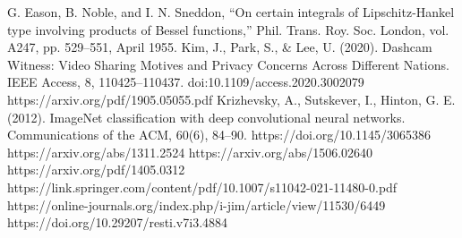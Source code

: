 \documentclass[conference]{IEEEtran}
\begin{document}

\begin{thebibliography}{00}
 G. Eason, B. Noble, and I. N. Sneddon, ``On certain integrals of Lipschitz-Hankel type involving products of Bessel functions,'' Phil. Trans. Roy. Soc. London, vol. A247, pp. 529--551, April 1955.
 Kim, J., Park, S., \& Lee, U. (2020). Dashcam Witness: Video Sharing Motives and Privacy Concerns Across Different Nations. IEEE Access, 8, 110425–110437. doi:10.1109/access.2020.3002079 
 https://arxiv.org/pdf/1905.05055.pdf
 Krizhevsky, A., Sutskever, I., Hinton, G. E. (2012). ImageNet classification with deep convolutional neural networks. Communications of the ACM, 60(6), 84–90. https://doi.org/10.1145/3065386
 https://arxiv.org/abs/1311.2524
 https://arxiv.org/abs/1506.02640
 https://arxiv.org/pdf/1405.0312
 https://link.springer.com/content/pdf/10.1007/s11042-021-11480-0.pdf
 https://online-journals.org/index.php/i-jim/article/view/11530/6449
 https://doi.org/10.29207/resti.v7i3.4884
\end{thebibliography}
\vspace{12pt}
\color{red}
\end{document}
